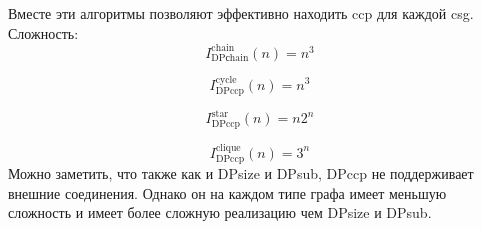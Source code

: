 \documentclass[12pt]{article}
\begin{document}
\begin{flushleft}
Вместе эти алгоритмы позволяют эффективно находить ccp для каждой csg.
Сложность:
\[
I^{\text{chain}}_{\text{DPсhain}}(n) =
n^3
\]

\[
I^{\text{cycle}}_{\text{DPccp}}(n) =
n^3
\]

\[
I^{\text{star}}_{\text{DPccp}}(n) =
n2^n
\]

\[
I^{\text{clique}}_{\text{DPccp}}(n) =
3^n
\]
Можно заметить, что также как и DPsize и DPsub, DPccp не поддерживает внешние соединения.
Однако он на каждом типе графа имеет меньшую сложность и имеет более сложную
реализацию чем DPsize и DPsub.
\end{flushleft}
\end{document}
